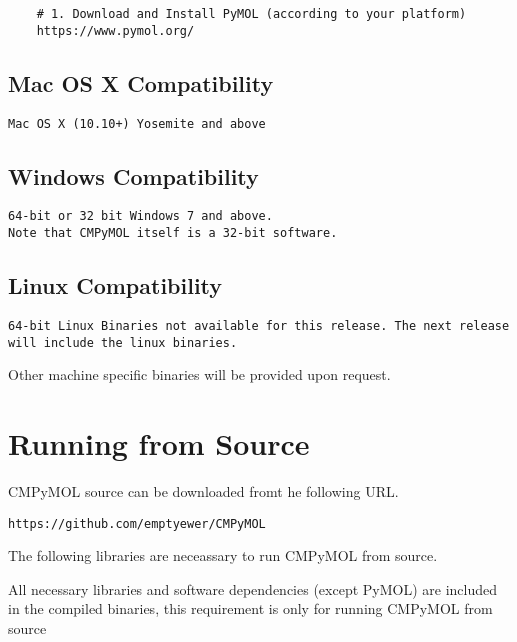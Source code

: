 \documentclass[11pt,fleqn]{book} %
\begin{document}
	\begin{lstlisting}
	# 1. Download and Install PyMOL (according to your platform)
	https://www.pymol.org/
	\end{lstlisting}

    \subsection{Mac OS X Compatibility}\label{mac_install}

    \texttt{Mac OS X (10.10+) Yosemite and above}

    \subsection{Windows Compatibility}\label{windows_install}

    \texttt{64-bit or 32 bit Windows 7 and above.\\Note that CMPyMOL itself is a 32-bit software.}

    \subsection{Linux Compatibility}\label{linux_install}

    \texttt{64-bit Linux Binaries not available for this release. The next release will include the linux binaries.}

    \begin{remark}
    Other machine specific binaries will be provided upon request.
    \end{remark}

\clearpage



\section{Running from Source}

CMPyMOL source can be downloaded fromt he following URL.
\begin{lstlisting}
https://github.com/emptyewer/CMPyMOL
\end{lstlisting}

The following libraries are neceassary to run CMPyMOL from source. 

\begin{remark}
All necessary libraries and software dependencies (except PyMOL) are included in the compiled binaries, this requirement is only for running CMPyMOL from source
\end{remark}
\end{document}
